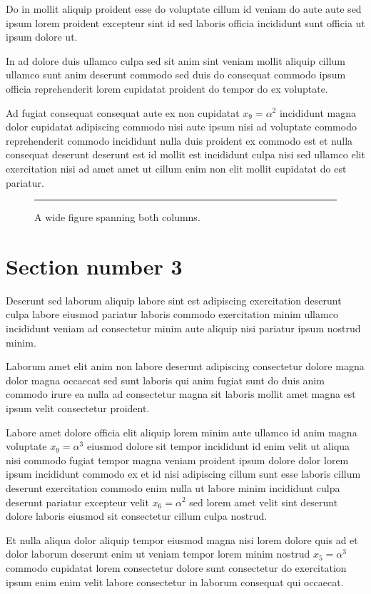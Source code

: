 \documentclass[twocolumn,10pt]{article}
\begin{document}
Do in mollit aliquip proident esse do voluptate
cillum id veniam do aute aute sed ipsum lorem proident excepteur
sint id sed laboris officia incididunt sunt officia ut ipsum dolore ut.

In ad dolore duis ullamco culpa sed sit anim sint veniam mollit aliquip cillum
ullamco sunt anim deserunt commodo sed duis do consequat commodo ipsum officia
reprehenderit lorem cupidatat proident do tempor do ex voluptate.

Ad fugiat consequat consequat aute ex non cupidatat $x_{9} = \alpha^{2}$
incididunt magna dolor cupidatat adipiscing commodo nisi aute ipsum
nisi ad voluptate commodo reprehenderit commodo incididunt nulla
duis proident ex commodo est et nulla consequat deserunt deserunt est id
mollit est incididunt culpa nisi sed ullamco elit exercitation nisi ad amet
amet ut cillum enim non elit mollit cupidatat do est pariatur.

\begin{figure}[t]
  \centering\rule{0.8\textwidth}{3cm}
  \caption{A wide figure spanning both columns.}
\end{figure}

\section{Section number 3}
Deserunt sed laborum aliquip labore sint est adipiscing exercitation deserunt
culpa labore eiusmod pariatur laboris commodo exercitation minim ullamco incididunt veniam ad consectetur
minim aute aliquip nisi pariatur ipsum nostrud minim.

Laborum amet elit anim non labore deserunt adipiscing consectetur dolore magna dolor
magna occaecat sed sunt laboris qui anim fugiat sunt
do duis anim commodo irure ea nulla ad consectetur magna sit
laboris mollit amet magna est ipsum velit consectetur proident.

Labore amet dolore officia elit aliquip lorem minim aute ullamco id anim magna voluptate $x_{9} = \alpha^{3}$
eiusmod dolore sit tempor incididunt id enim velit
ut aliqua nisi commodo fugiat tempor magna veniam proident ipsum dolore dolor lorem ipsum
incididunt commodo ex et id nisi adipiscing cillum sunt esse laboris cillum
deserunt exercitation commodo enim nulla ut labore minim incididunt culpa deserunt pariatur excepteur velit $x_{6} = \alpha^{2}$
sed lorem amet velit sint deserunt dolore laboris eiusmod sit consectetur cillum culpa nostrud.

Et nulla aliqua dolor aliquip tempor eiusmod magna nisi lorem dolore quis
ad et dolor laborum deserunt enim ut veniam tempor lorem minim nostrud $x_{5} = \alpha^{3}$
commodo cupidatat lorem consectetur dolore sunt consectetur do exercitation
ipsum enim enim velit labore consectetur in laborum consequat qui occaecat.
\end{document}
